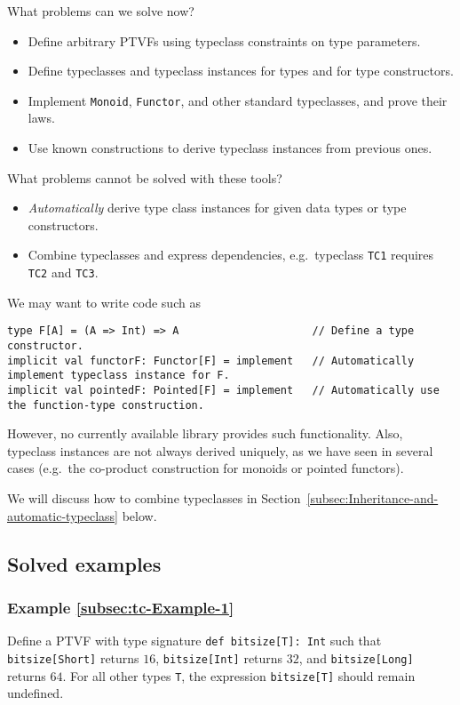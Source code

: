 What problems can we solve now?
\begin{itemize}
\item Define arbitrary PTVFs using typeclass constraints on type parameters.
\item Define typeclasses and typeclass instances for types and for type
constructors.
\item Implement \lstinline!Monoid!, \lstinline!Functor!, and other standard
typeclasses, and prove their laws.
\item Use known constructions to derive typeclass instances from previous
ones.
\end{itemize}
What problems cannot be solved with these tools?
\begin{itemize}
\item \emph{Automatically} derive type class instances for given data types
or type constructors.
\item Combine typeclasses and express dependencies, e.g.~typeclass \lstinline!TC1!
requires \lstinline!TC2! and \lstinline!TC3!.
\end{itemize}
We may want to write code such as
\begin{lstlisting}
type F[A] = (A => Int) => A                     // Define a type constructor.
implicit val functorF: Functor[F] = implement   // Automatically implement typeclass instance for F.
implicit val pointedF: Pointed[F] = implement   // Automatically use the function-type construction.
\end{lstlisting}
However, no currently available library provides such functionality.
Also, typeclass instances are not always derived uniquely, as we have
seen in several cases (e.g.~the co-product construction for monoids
or pointed functors).

We will discuss how to combine typeclasses in Section~\ref{subsec:Inheritance-and-automatic-typeclass}
below.

\subsection{Solved examples}

\subsubsection{Example \label{subsec:tc-Example-1}\ref{subsec:tc-Example-1}}

Define a PTVF with type signature \lstinline!def bitsize[T]: Int!
such that \lstinline!bitsize[Short]! returns $16$, \lstinline!bitsize[Int]!
returns $32$, and \lstinline!bitsize[Long]! returns $64$. For all
other types \lstinline!T!, the expression \lstinline!bitsize[T]!
should remain undefined.

